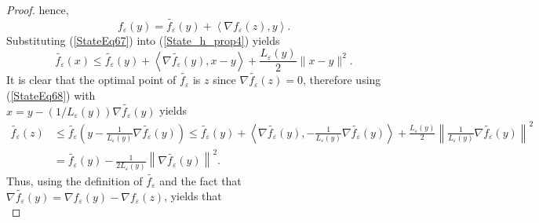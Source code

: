 \documentclass[11pt]{article}
\numberwithin{equation}{section}
\begin{document}
\begin{proof}
hence,
\begin{equation}
	 f_{\varepsilon}(y) = \widetilde{f_{\varepsilon}}(y) + \left\langle \nabla f_{\varepsilon}(z), y \right\rangle . \label{StateEq67}
\end{equation}
Substituting (\ref{StateEq67}) into (\ref{State_h_prop4}) yields
\begin{equation}
	\widetilde{f_{\varepsilon}}(x) \leq \widetilde{f_{\varepsilon}}(y) + \left\langle \nabla \widetilde{f_{\varepsilon}}(y), x-y \right\rangle + \frac{L_{\varepsilon}(y)}{2} \|x-y\|^2. \label{StateEq68}
\end{equation}
It is clear that the optimal point of $\widetilde{f_{\varepsilon}}$ is $z$ since $\nabla \widetilde{f_{\varepsilon}}(z) = 0$, therefore using (\ref{StateEq68}) with \\$x = y - \left( 1/L_{\varepsilon}(y) \right) \nabla \widetilde{f_{\varepsilon}}(y)$ yields
\begin{align*}
	\widetilde{f_{\varepsilon}}(z) &\leq \widetilde{f_{\varepsilon}}\left( y - \frac{1}{L_{\varepsilon}(y)} \nabla \widetilde{f_{\varepsilon}}(y) \right) \leq \widetilde{f_{\varepsilon}}(y) + \left\langle \nabla \widetilde{f_{\varepsilon}}(y), - \frac{1}{L_{\varepsilon}(y)} \nabla \widetilde{f_{\varepsilon}}(y) \right\rangle + \frac{L_{\varepsilon}(y)}{2} \left\lVert \frac{1}{L_{\varepsilon}(y)} \nabla \widetilde{f_{\varepsilon}}(y) \right\rVert ^2 \\
	&= \widetilde{f_{\varepsilon}}(y) - \frac{1}{2 L_{\varepsilon}(y)} \left\lVert \nabla \widetilde{f_{\varepsilon}}(y) \right\rVert ^2.
\end{align*}
Thus, using the definition of $\widetilde{f_{\varepsilon}}$ and the fact that $\nabla \widetilde{f_{\varepsilon}}(y) = \nabla f_{\varepsilon}(y) - \nabla f_{\varepsilon}(z)$, yields that
\begin{equation*}

\end{equation*}
\end{proof}
\end{document}
